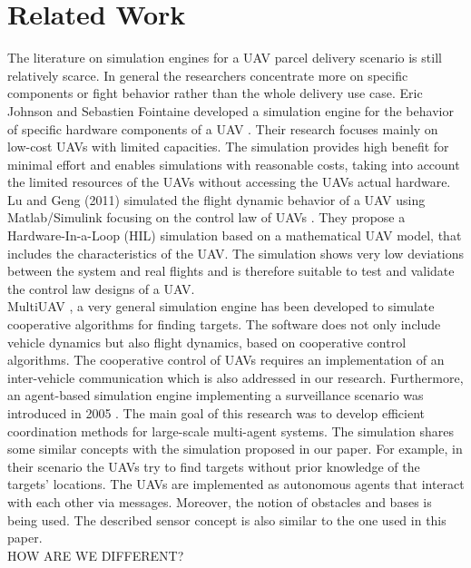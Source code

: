 \section{Related Work}
The literature on simulation engines for a UAV parcel delivery scenario is still relatively scarce. In general the researchers concentrate more on specific components or fight behavior rather than the whole delivery use case. Eric Johnson and Sebastien Fointaine developed a simulation engine for the behavior of specific hardware components of a UAV \cite{johnson.2001}. Their research focuses mainly on low-cost UAVs with limited capacities. The simulation provides high benefit for minimal effort and enables simulations with reasonable costs, taking into account the limited resources of the UAVs without accessing the UAVs actual hardware. Lu and Geng (2011) simulated the flight dynamic behavior of a UAV using Matlab/Simulink focusing on the control law of UAVs \cite{lu.2011}. They propose a Hardware-In-a-Loop (HIL) simulation based on a mathematical UAV model, that includes the characteristics of the UAV. The simulation shows very low deviations between the system and real flights and is therefore suitable to test and validate the control law designs of a UAV. \\
MultiUAV \cite{rasmussen.2003}, a very general simulation engine has been developed to simulate cooperative algorithms for finding targets. The software does not only include vehicle dynamics but also flight dynamics, based on cooperative control algorithms. The cooperative control of UAVs requires an implementation of an inter-vehicle communication which is also addressed in our research. Furthermore, an agent-based simulation engine implementing a surveillance scenario was introduced in 2005 \cite{jang.2005}. The main goal of this research was to develop efficient coordination methods for large-scale multi-agent systems. The simulation shares some similar concepts with the simulation proposed in our paper. For example, in their scenario the UAVs try to find targets without prior knowledge of the targets’ locations. The UAVs are implemented as autonomous agents that interact with each other via messages. Moreover, the notion of obstacles and bases is being used. The described sensor concept is also similar to the one used in this paper.\\
HOW ARE WE DIFFERENT?

